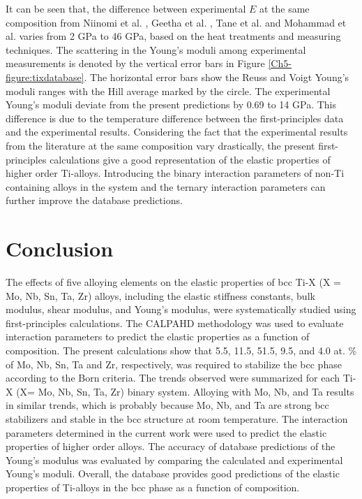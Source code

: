 It  can be seen that, the difference between experimental $E$ at the same composition from Niinomi et al. \cite{Niinomi2012}, Geetha et al. \cite{Geetha2009}, Tane et al. \cite{Tane2010a} and Mohammad et al. \cite{Mohammed2014} varies from 2 GPa to 46 GPa, based on the heat treatments and measuring techniques. The scattering in the Young's moduli among experimental measurements is denoted by the vertical error bars in Figure \ref{Ch5-figure:tixdatabase}. The horizontal error bars show the Reuss and Voigt Young's moduli ranges with the Hill average marked by the circle. The experimental Young's moduli deviate from the present predictions by 0.69 to 14 GPa. This difference is due to the temperature difference between the first-principles data and the experimental results. Considering the fact that the experimental results from the literature at the same composition vary drastically, the present first-principles calculations give a good representation of the elastic properties of higher order Ti-alloys. Introducing the binary interaction parameters of non-Ti containing alloys in the system and the ternary interaction parameters can further improve the database predictions. 


\section{Conclusion}

The effects of five alloying elements on the elastic properties of bcc Ti-X (X = Mo, Nb, Sn, Ta, Zr) alloys, including the elastic stiffness constants, bulk modulus, shear modulus, and Young's modulus, were systematically studied using first-principles calculations. The CALPAHD methodology was used to evaluate interaction parameters to predict the elastic properties as a function of composition. The present calculations show that 5.5, 11.5, 51.5, 9.5, and 4.0 at. \% of Mo, Nb, Sn, Ta and Zr, respectively, was required to stabilize the bcc phase according to the Born criteria. The trends observed were summarized for each Ti-X (X= Mo, Nb, Sn, Ta, Zr) binary system. Alloying with Mo, Nb, and Ta results in similar trends, which is probably because Mo, Nb, and Ta are strong bcc stabilizers and stable in the bcc structure at room temperature. The interaction parameters determined in the current work were used to predict the elastic properties of higher order alloys. The accuracy of database predictions of the Young's modulus was evaluated by comparing the calculated and experimental Young's moduli. Overall, the database provides good predictions of the elastic properties of Ti-alloys in the bcc phase as a function of composition. 

